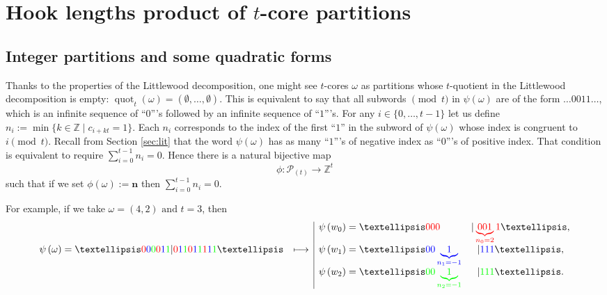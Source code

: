\documentclass[11pt,letterpaper]{amsart}
\def\bbbz{\mathbb Z}
\def\ccp{\mathcal P}
\DeclareMathOperator{\quot}{quot}
\numberwithin{equation}{section}
\numberwithin{df}{section}
\begin{document}
\section{Hook lengths product of $t$-core partitions}\label{sec:hook}
\subsection{Integer partitions and some quadratic forms}\label{chap3:quad}

Thanks to the properties of the Littlewood decomposition, one might see $t$-cores $\omega$ as partitions whose $t$-quotient in the Littlewood decomposition is empty: $\quot_t(\omega)=\left(\emptyset,\dots,\emptyset\right)$. This is equivalent to say that all subwords $\pmod{t}$ in $\psi(\omega)$ are of the form $\ldots 0011\ldots$, which is an infinite sequence of ``$0$'''s followed by an infinite sequence of ``$1$'''s. For any $i\in\lbrace 0,\dots,t-1\rbrace$ let us define $n_i:=\min\lbrace k \in\bbbz\mid c_{i+kt}=1\rbrace$. Each $n_i$ corresponds to the index of the first ``$1$'' in the subword of $\psi(\omega)$ whose index is congruent to $i \pmod t$. Recall from Section \ref{sec:lit} that the word $\psi(\omega)$ has as many ``$1$'''s of negative index as ``$0$'''s of positive index. That condition is equivalent to require $\sum_{i=0}^{t-1}n_i=0$.
Hence there is a natural bijective map 
$$\phi:\ccp_{(t)}\rightarrow\bbbz^t$$
 such that if we set $\phi(\omega):=\mathbf{n}$ then $\sum_{i=0}^{t-1}n_i=0$.


For example, if we take $\omega = (4,2) \text{ and } t=3$, then 
\begin{align*}
\begin{array}{rc|lc}
& &\psi\left(w_{0}\right)=\ldots \color{red} 000 &\color{black}|\color{red}\underbrace{001}_{n_0=2}1\color{black}\ldots,\\
 \psi\left(\omega\right)=\ldots \color{red}{0} \color{blue}{0} \color{green}{0} \color{red}{0} \color{blue}{1}\color{green}{1} \color{black}| \color{red}{0} \color{blue}{1} \color{green}{1} \color{red}{0} \color{blue}{1} \color{green}{1}\color{red}{1}\color{blue}{1} \color{green}{1}\color{black} \ldots& \longmapsto& \psi\left(w_{1}\right)=\ldots \color{blue} 00\underbrace{1}_{n_1=-1}&\color{black}| \color{blue}111\color{black}\ldots , \\
  & & \psi\left(w_{2}\right)=\ldots \color{green} 00\underbrace{1}_{n_2=-1} &\color{black}| \color{green}111\color{black}\ldots .
\end{array}
\end{align*}
\end{document}
